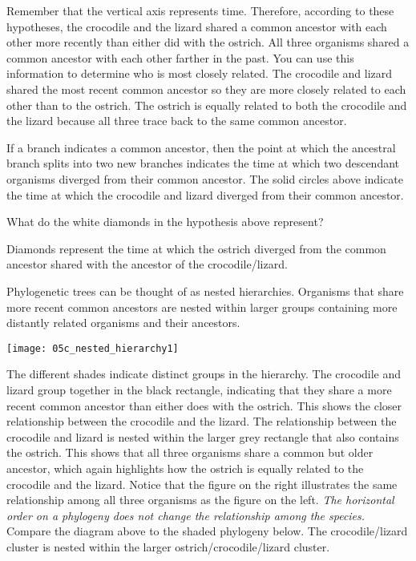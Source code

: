 \documentclass[12pt, hidelinks]{exam}
\newcommand*\AnswerBox[2]{%
    \parbox[t][#1]{0.92\textwidth}{%
    \begin{solution}#2\end{solution}}
    \vspace{\stretch{1}}
}
\begin{document}
Remember that the vertical axis represents time. Therefore, according to
these hypotheses, the crocodile and the lizard shared a common ancestor
with each other more recently than either did with the ostrich. All
three organisms shared a common ancestor with each other farther in the
past. You can use this information to determine who is most closely
related. The crocodile and lizard shared the most recent common ancestor
so they are more closely related to each other than to the ostrich. The
ostrich is equally related to both the crocodile and the lizard because
all three trace back to the same common ancestor.

If a branch indicates a common ancestor, then the point at which the
ancestral branch splits into two new branches indicates the time at
which two descendant organisms diverged from their common ancestor. The
solid circles above indicate the time at which the crocodile and lizard
diverged from their common ancestor.

\begin{questions}
\setcounter{question}{3}


\question
What do the white diamonds in the hypothesis above
represent?

\AnswerBox{2\baselineskip}{Diamonds represent the time at which the ostrich
diverged from the common ancestor shared with the ancestor of the crocodile/lizard.}

\end{questions}

Phylogenetic trees can be thought of as nested hierarchies. Organisms
that share more recent common ancestors are nested within larger groups
containing more distantly related organisms and their ancestors. %

\begin{center}
	\noindent\texttt{[image: 05c\_nested\_hierarchy1]}
\end{center}

The different shades indicate distinct groups in the hierarchy. The
crocodile and lizard group together in the black rectangle, indicating
that they share a more recent common ancestor than either does with the
ostrich. This shows the closer relationship between the crocodile
and the lizard. The relationship between the crocodile and lizard is
nested within the larger grey rectangle that also contains the ostrich.
This shows that all three organisms share a common but older
ancestor, which again highlights how the ostrich is equally related to
the crocodile and the lizard. Notice that the figure on the right
illustrates the same relationship among all three organisms as the
figure on the left. \emph{The horizontal order on a phylogeny
does not change the relationship among the species.} Compare the diagram 
above to the shaded phylogeny below. The crocodile/lizard cluster is nested within
the larger ostrich/crocodile/lizard cluster.
\end{document}
